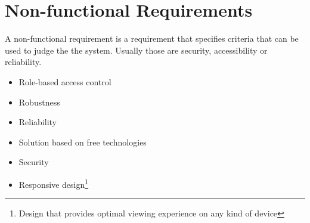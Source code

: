 \documentclass[thesis=B,english]{FITthesis}[2012/10/20]
\begin{document}
\section{Non-functional Requirements}
A non-functional requirement is a requirement that specifies criteria that can be used to judge the the system. Usually those are security, accessibility or reliability.
\begin{itemize}
  \item Role-based access control
  \item Robustness
  \item Reliability
  \item Solution based on free technologies
  \item Security
  \item Responsive design\footnote{Design that provides optimal viewing experience on any kind of device} 
\end{itemize}
\end{document}
